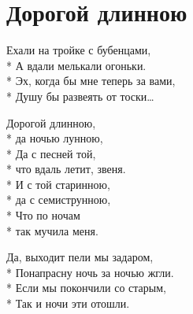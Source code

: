 \vspace{\fill}\newpage

\section{Дорогой длинною}
\label{song:Дорогой_длинною}

\medskip

\begin{minipage}{\linewidth}
Ехали на тройке с бубенцами,\\*
А вдали мелькали огоньки.\\*
Эх, когда бы мне теперь за вами,\\*
Душу бы развеять от тоски…\\
\end{minipage}\par\medskip\nobreak

\medskip

\begin{minipage}{\linewidth}
\hspace*{1.5em}Дорогой длинною,\\*
\hspace*{1.5em}да ночью лунною,\\*
\hspace*{1.5em}Да с песней той,\\*
\hspace*{1.5em}что вдаль летит, звеня.\\*
\hspace*{1.5em}И с той старинною,\\*
\hspace*{1.5em}да с семиструнною,\\*
\hspace*{1.5em}Что по ночам\\*
\hspace*{1.5em}так мучила меня.\\
\end{minipage}\par\medskip\nobreak

\medskip

\begin{minipage}{\linewidth}
Да, выходит пели мы задаром,\\*
Понапрасну ночь за ночью жгли.\\*
Если мы покончили со старым,\\*
Так и ночи эти отошли.\\
\end{minipage}\par\medskip\nobreak

